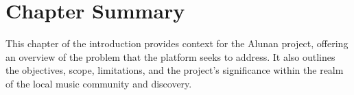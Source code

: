 \section{Chapter Summary}
This chapter of the introduction provides context for the Alunan project, offering an overview of the problem that the platform seeks to address. It also outlines the objectives, scope, limitations, and the project's significance within the realm of the local music community and discovery.